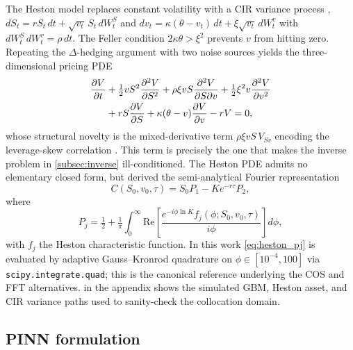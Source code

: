 The Heston model \parencite{heston1993closed} replaces constant volatility with a CIR variance process \parencite{cox1985cir}, $dS_t=rS_t\,dt+\sqrt{v_t}\,S_t\,dW_t^S$ and $dv_t=\kappa(\theta-v_t)\,dt+\xi\sqrt{v_t}\,dW_t^v$ with $dW_t^S\,dW_t^v=\rho\,dt$. The Feller condition $2\kappa\theta>\xi^2$ \parencite{feller1951two} prevents $v$ from hitting zero. Repeating the $\Delta$-hedging argument with two noise sources yields the three-dimensional pricing PDE \parencite{ekstrom2010bs,rouah2013heston}
\begin{align}\label{eq:heston_pde}
    \frac{\partial V}{\partial t}
    &+\tfrac{1}{2}vS^2\frac{\partial^2 V}{\partial S^2}
    +\rho\xi vS\frac{\partial^2 V}{\partial S\partial v}
    +\tfrac{1}{2}\xi^2 v\frac{\partial^2 V}{\partial v^2} \notag\\
    &+rS\frac{\partial V}{\partial S}+\kappa(\theta-v)\frac{\partial V}{\partial v}-rV=0,
\end{align}
whose structural novelty is the mixed-derivative term $\rho\xi vS\,V_{Sv}$ encoding the leverage-skew correlation \parencite{gatheral2018volatility}. This term is precisely the one that makes the inverse problem in \cref{subsec:inverse} ill-conditioned. The Heston PDE admits no elementary closed form, but \textcite{heston1993closed} derived the semi-analytical Fourier representation
\begin{equation}\label{eq:heston_cf_price}
    C(S_0,v_0,\tau)=S_0 P_1-Ke^{-r\tau}P_2,
\end{equation}
where
\begin{equation}\label{eq:heston_pj}
    P_j=\tfrac{1}{2}+\tfrac{1}{\pi}\int_0^{\infty}\mathrm{Re}\!\left[\frac{e^{-i\phi\ln K}f_j(\phi;S_0,v_0,\tau)}{i\phi}\right]d\phi,
\end{equation}
with $f_j$ the Heston characteristic function. In this work \eqref{eq:heston_pj} is evaluated by adaptive Gauss--Kronrod quadrature on $\phi\in[10^{-4},100]$ via \texttt{scipy.integrate.quad}; this is the canonical reference underlying the COS \parencite{fang2008cos} and FFT \parencite{carr1999fft,albrecher2007heston} alternatives.  in the appendix shows the simulated GBM, Heston asset, and CIR variance paths used to sanity-check the collocation domain.

\subsection{PINN formulation}\label{subsec:pinn}

